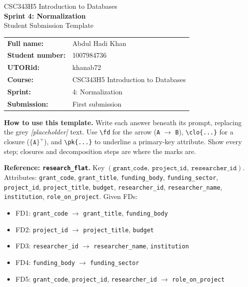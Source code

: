 \documentclass[11pt, letterpaper]{article}
\newcommand{\attr}[1]{\texttt{#1}}
\newcommand{\fd}{\ensuremath{\rightarrow}}
\newcommand{\clo}[1]{\ensuremath{\{#1\}^{+}}}
\newcommand{\pk}[1]{\underline{\texttt{#1}}}          %
\newcommand{\todo}[1]{{\color{muted}\textit{[#1]}}}    %
\begin{document}
\begin{center}
  {\small\color{muted}CSC343H5 Introduction to Databases}\\[4pt]
  {\LARGE\bfseries\color{dark}Sprint 4: Normalization}\\[4pt]
  {\small\color{muted}Student Submission Template}
\end{center}
\vspace{6pt}

\begin{tabular}{@{}ll@{}}
  \textbf{Full name:}      & {Abdul Hadi Khan} \\
  \textbf{Student number:} & {1007984736} \\
  \textbf{UTORid:}         & {khanab72} \\
  \textbf{Course:}         & CSC343H5 Introduction to Databases \\
  \textbf{Sprint:}         & 4: Normalization \\
  \textbf{Submission:}     & First submission \\
\end{tabular}

\vspace{8pt}

\textbf{How to use this template.} Write each answer beneath its prompt, replacing the grey \todo{placeholder} text. Use \verb|\fd| for the arrow (\attr{A} \fd{} \attr{B}), \verb|\clo{...}| for a closure ($\clo{\attr{A}}$), and \verb|\pk{...}| to underline a primary-key attribute. Show every step; closures and decomposition steps are where the marks are.

\medskip
\textbf{Reference: \attr{research\_flat}.} Key
$(\attr{grant\_code},\ \attr{project\_id},\ \attr{researcher\_id})$. Attributes:
\attr{grant\_code}, \attr{grant\_title}, \attr{funding\_body}, \attr{funding\_sector},
\attr{project\_id}, \attr{project\_title}, \attr{budget}, \attr{researcher\_id},
\attr{researcher\_name}, \attr{institution}, \attr{role\_on\_project}. Given FDs:

\begin{itemize}[itemsep=1pt, topsep=2pt]
  \item FD1: \attr{grant\_code} \fd{} \attr{grant\_title}, \attr{funding\_body}
  \item FD2: \attr{project\_id} \fd{} \attr{project\_title}, \attr{budget}
  \item FD3: \attr{researcher\_id} \fd{} \attr{researcher\_name}, \attr{institution}
  \item FD4: \attr{funding\_body} \fd{} \attr{funding\_sector}
  \item FD5: \attr{grant\_code}, \attr{project\_id}, \attr{researcher\_id} \fd{} \attr{role\_on\_project}
\end{itemize}
\end{document}
